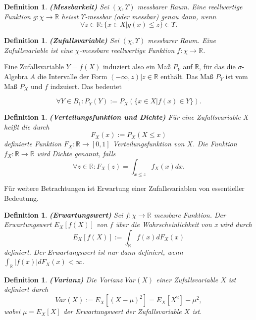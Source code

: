 \documentclass[12pt,a4paper]{scrartcl}
\newtheorem{Definition}[Satz]{Definition}
\numberwithin{equation}{section}
\newcommand{\R}{\mathbb{R}} %
\begin{document}
{\begin{Definition}\textbf{(Messbarkeit)}
 Sei $(\chi,\varUpsilon)$ messbarer Raum. Eine reellwertige Funktion $g: \chi \rightarrow \R$
 heisst $\varUpsilon$-messbar (oder messbar) genau dann, wenn 
 $$
 \forall z \in \R: \textit{\{} x \in X | g(x) \leq z \textit{\}} \in \varUpsilon.
 $$
 \end{Definition}

\begin{Definition}\textbf{(Zufallsvariable)}
Sei $(\chi,\varUpsilon)$ messbarer Raum. Eine Zufallsvariable ist eine $\chi$-messbare reellwertige
Funktion $f: \chi \rightarrow \R$.
\end{Definition}

Eine Zufallsvariable $Y = f(X)$ induziert also ein Maß $P_{Y}$ auf $\R$, für das die 
$\sigma$-Algebra $A$ die Intervalle der Form {$(-\infty,z)|z \in \R$} enthält. Das Maß 
$P_{Y}$ ist vom Maß $P_{X}$ und $f$ indzuiert. Das bedeutet

$$
\forall Y \in B_{1}: P_{Y}(Y) := P_{X}(\textit{\{} x \in X | f(x) \in Y \textit{\}}).
$$

\begin{Definition}\textbf{(Verteilungsfunktion und Dichte)}
Für eine Zufallsvariable X heißt die durch 
$$
F_{X}(x) := P_{X}(X \leq x)
$$
definierte Funktion $F_{X}: \R \rightarrow [0,1]$ Verteilungsfunktion von $X$.
Die Funktion $f_{X}: \R \rightarrow \R$ wird Dichte genannt, falls 
$$
\forall z \in \R: F_{X}(z) = \int_{x \leq z} f_{X}(x) dx. 
$$
\end{Definition}

Für weitere Betrachtungen ist Erwartung einer Zufallsvariablen von essentieller Bedeutung. 

\begin{Definition}\textbf{(Erwartungswert)}
 Sei $f: \chi \rightarrow \R $ messbare Funktion. Der Erwartungswert $E_{X}[f(X)]$ von $f$
 über die Wahrscheinlichkeit von x wird durch 
 $$
 E_{X}[f(X)] := \int_{\R}f(x)dF_{X}(x)
 $$
 definiert. Der Erwartungswert ist nur dann definiert, wenn $\int_{\R}|f(x)|dF_{X}(x) < \infty$.
\end{Definition}

\begin{Definition}\textbf{(Varianz)}
 Die Varianz $Var(X)$ einer Zufallsvariable $X$ ist definiert durch 
 $$
 Var(X) := E_{X}[(X-\mu)^{2}] = E_{X}[X^{2}] - \mu^{2},
 $$
 wobei $\mu = E_{X}[X]$ der Erwartungswert der Zufallsvariable $X$ ist.  
\end{Definition}

}
\end{document}
